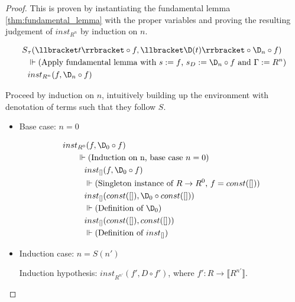   \begin{proof}
    This is proven by instantiating the fundamental lemma \ref{thm:fundamental_lemma} with the proper variables and proving the resulting judgement of $inst_{R^n}$ by induction on $n$.

    \begin{align*}
      S&_{\tau}(\llbracket t \rrbracket \circ f, \llbracket \D(t) \rrbracket \circ \D_n \circ f) \\
      & \Vdash \text{(Apply fundamental lemma with $s := f$, $s_D := \D_n \circ f$ and $\Gamma := R^n$)} \\
      & inst_{R^n}(f, \D_n \circ f) \\
    \end{align*}

    Proceed by induction on $n$, intuitively building up the environment with denotation of terms such that they follow $S$.

    \begin{itemize}
      \item Base case: $n = 0$

      \begin{align*}
        inst&_{R^0}(f, \D_0 \circ f) \\
        & \Vdash \text{(Induction on n, base case $n = 0$)} \\
        & \;\;\; inst_{[]}(f, \D_0 \circ f) \\
        & \;\;\; \Vdash \text{(Singleton instance of $R \rightarrow R^0$, $f = const([])$)} \\
        & \;\;\; inst_{[]}(const([]), \D_0 \circ const([])) \\
        & \;\;\; \Vdash \text{(Definition of $\D_0$)} \\
        & \;\;\; inst_{[]}(const([]), const([])) \\
        & \;\;\; \Vdash \text{(Definition of $inst_{[]}$)}
      \end{align*}

      \item Induction case: $n = S(n')$

      Induction hypothesis: $inst_{R^{n'}}(f', D \circ f')$, where
        $f' : R \rightarrow \llbracket R^{n'}\rrbracket$.


\end{itemize}
\end{proof}
